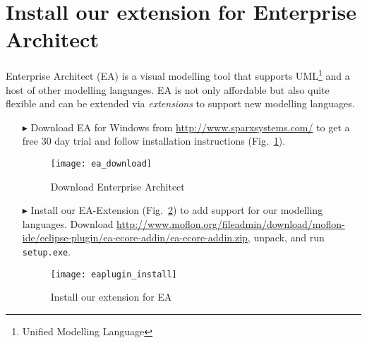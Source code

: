 \newpage
\visHeader

\section{Install our extension for Enterprise Architect}
\label{stepOne}
Enterprise Architect (EA) is a visual modelling tool that supports UML\footnote{Unified Modelling Language} and a host of other modelling languages.
EA is not only affordable but also quite flexible and can be extended via \emph{extensions} to support new modelling languages.
\begin{enumerate}
  
\item[$\blacktriangleright$] Download EA for Windows from \url{http://www.sparxsystems.com/} to get a free 30 day trial and follow installation instructions (Fig.~\ref{fig_enterpriseArchitextHomepage}).

\begin{figure}[htbp]
	\centering
  	\texttt{[image: ea\_download]}
	\caption{Download Enterprise Architect}
	\label{fig_enterpriseArchitextHomepage}
\end{figure} 

\item[$\blacktriangleright$] Install our EA-Extension (Fig.~\ref{fig_eaPluginWizard}) to add support for our modelling languages.
Download \url{http://www.moflon.org/fileadmin/download/moflon-ide/eclipse-plugin/ea-ecore-addin/ea-ecore-addin.zip}, unpack, and run \texttt{setup.exe}.

\begin{figure}[htbp]
	\centering
  \texttt{[image: eaplugin\_install]}
	\caption{Install our extension for EA}
	\label{fig_eaPluginWizard}
\end{figure}
\end{enumerate}
 

\clearpage
\texHeader
\mbox{}
\clearpage





